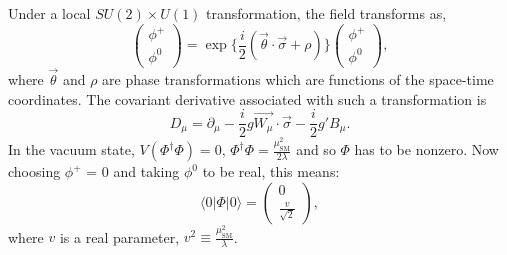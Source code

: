 Under a local $SU(2)\times U(1)$ transformation, the field transforms as,
\begin{equation}\label{eqn:hfield_trsf}
\begin{pmatrix} \phi^+ \\
\phi^0 \end{pmatrix} = \exp{\{\frac{i}{2}(\vec{\theta}\cdot\vec{\sigma} + \rho)\}}
\begin{pmatrix} \phi^+ \\
\phi^0 \end{pmatrix}, 
\end{equation}
where $\vec{\theta}$ and $\rho$
are phase transformations which are functions of the space-time coordinates. The covariant
derivative associated with such a transformation is
\begin{equation}\label{eqn:H_cov_deriv}
D_{\mu} = \partial_{\mu} - \frac{i}{2}g\vec{W_{\mu}}\cdot\vec{\sigma} - \frac{i}{2}g'B_{\mu}.
\end{equation}
In the vacuum state, $V(\Phi^{\dagger}\Phi) =0$, $\Phi^{\dagger}\Phi=\frac{\mu_{\text{SM}}^2}{2\lambda}$ and so
$\Phi$ has to be nonzero.
Now choosing $\phi^+$ = 0 and taking $\phi^0$ to be real, this means:
\begin{equation}\label{eqn:field_vev}
\langle 0 | \Phi | 0 \rangle = \begin{pmatrix} 0 \\
\frac{v}{\sqrt{2}} \end{pmatrix},
\end{equation}
where $v$ is a real parameter, $v^2 \equiv \frac{\mu_{\text{SM}}^2}{\lambda}$.

